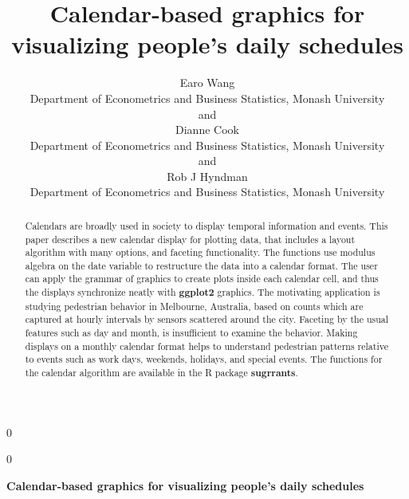 \documentclass[12pt]{article}
\newcommand{\blind}{0}
\begin{document}
\def\spacingset#1{\renewcommand{\baselinestretch}%
{#1}\small\normalsize} \spacingset{1}



\blind
{
  \title{\bf Calendar-based graphics for visualizing people's daily schedules}

  \author{
        Earo Wang \\
    Department of Econometrics and Business Statistics, Monash University\\
     and \\     Dianne Cook \\
    Department of Econometrics and Business Statistics, Monash University\\
     and \\     Rob J Hyndman \\
    Department of Econometrics and Business Statistics, Monash University\\
      }
  \maketitle
} \fi

\blind
{
  \bigskip
  \bigskip
  \bigskip
  \begin{center}
    {\LARGE\bf Calendar-based graphics for visualizing people's daily schedules}
  \end{center}
  \medskip
} \fi

\bigskip
\begin{abstract}
Calendars are broadly used in society to display temporal information and events. This paper describes a new calendar display for plotting data, that includes a layout algorithm with many options, and faceting functionality. The functions use modulus algebra on the date variable to restructure the data into a calendar format. The user can apply the grammar of graphics to create plots inside each calendar cell, and thus the displays synchronize neatly with \textbf{ggplot2} graphics. The motivating application is studying pedestrian behavior in Melbourne, Australia, based on counts which are captured at hourly intervals by sensors scattered around the city. Faceting by the usual features such as day and month, is insufficient to examine the behavior. Making displays on a monthly calendar format helps to understand pedestrian patterns relative to events such as work days, weekends, holidays, and special events. The functions for the calendar algorithm are available in the R package \textbf{sugrrants}.
\end{abstract}
\end{document}

